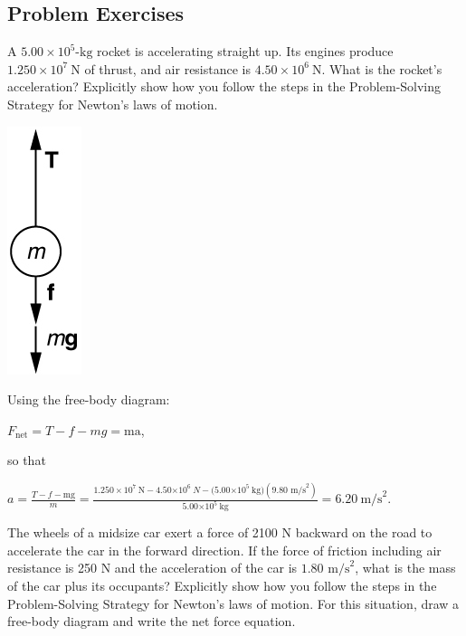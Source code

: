 \documentclass[
]{book}
\newenvironment{problems-exercises}{}{}
\begin{document}
\hypertarget{fs-id2328021}{}
\begin{problems-exercises}

\hypertarget{problem-exercises-3}{%
\subsection{Problem Exercises}\label{problem-exercises-3}}

\hypertarget{fs-id1250439}{}
\leavevmode\hypertarget{fs-id1778338}{}%
A \({5\text{.}{\text{00} \times \text{10}^{5}}\text{-kg}}{}\) rocket is
accelerating straight up. Its engines produce
\({1\text{.}{\text{250} \times \text{10}^{7}\ }\text{N}}{}\) of thrust,
and air resistance is
\({4\text{.}{\text{50} \times \text{10}^{6}}\ \text{N}}{}\). What is the
rocket's acceleration? Explicitly show how you follow the steps in the
Problem-Solving Strategy for Newton's laws of motion.

\leavevmode\hypertarget{fs-id1443649}{}%
\includegraphics{images/Figure_04_06_02.jpg}

Using the free-body diagram:

\({{F_{\text{net}} = {T - f - mg}} = \text{ma}}{}\),

so that

\({{{{a = \frac{T{-}f{-}\text{mg}}{m}} = \frac{1\text{.}{\text{250} \times \text{10}^{7}\ }{\text{N} - 4.50}{\times \text{10}^{\text{6}}}\ {N - (}5.00{\times \text{10}^{5}\ }\text{kg})(9.\text{80\ m/s}^{2})}{5.00{\times \text{10}^{5}}\ \text{kg}}} = \text{6.20}}\ \text{m/s}^{2}}{}\).

\hypertarget{fs-id2651416}{}
\leavevmode\hypertarget{fs-id1224285}{}%
The wheels of a midsize car exert a force of 2100 N backward on the road
to accelerate the car in the forward direction. If the force of friction
including air resistance is 250 N and the acceleration of the car is
\({1\text{.}\text{80\ m/s}^{2}}{}\), what is the mass of the car plus its
occupants? Explicitly show how you follow the steps in the
Problem-Solving Strategy for Newton's laws of motion. For this
situation, draw a free-body diagram and write the net force equation.


\end{problems-exercises}
\end{document}

